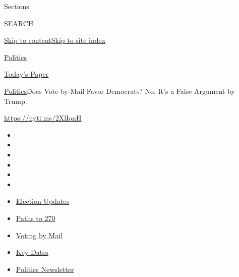 Sections

SEARCH

\protect\hyperlink{site-content}{Skip to
content}\protect\hyperlink{site-index}{Skip to site index}

\href{https://www.nytimes3xbfgragh.onion/section/politics}{Politics}

\href{https://myaccount.nytimes3xbfgragh.onion/auth/login?response_type=cookie\&client_id=vi}{}

\href{https://www.nytimes3xbfgragh.onion/section/todayspaper}{Today's
Paper}

\href{/section/politics}{Politics}\textbar{}Does Vote-by-Mail Favor
Democrats? No. It's a False Argument by Trump.

\url{https://nyti.ms/2XlIonH}

\begin{itemize}
\item
\item
\item
\item
\item
\item
\end{itemize}

\begin{itemize}
\item
  \href{https://www.nytimes3xbfgragh.onion/live/2020/09/07/us/trump-vs-biden?action=click\&pgtype=Article\&state=default\&region=TOP_BANNER\&context=storylines_menu}{Election
  Updates}
\item
  \href{https://www.nytimes3xbfgragh.onion/interactive/2020/us/elections/election-states-biden-trump.html?action=click\&pgtype=Article\&state=default\&region=TOP_BANNER\&context=storylines_menu}{Paths
  to 270}
\item
  \href{https://www.nytimes3xbfgragh.onion/interactive/2020/08/31/us/politics/vote-by-mail-deadlines.html?action=click\&pgtype=Article\&state=default\&region=TOP_BANNER\&context=storylines_menu}{Voting
  by Mail}
\item
  \href{https://www.nytimes3xbfgragh.onion/interactive/2019/us/elections/2020-presidential-election-calendar.html?action=click\&pgtype=Article\&state=default\&region=TOP_BANNER\&context=storylines_menu}{Key
  Dates}
\item
  \href{https://www.nytimes3xbfgragh.onion/newsletters/politics?action=click\&pgtype=Article\&state=default\&region=TOP_BANNER\&context=storylines_menu}{Politics
  Newsletter}
\end{itemize}

